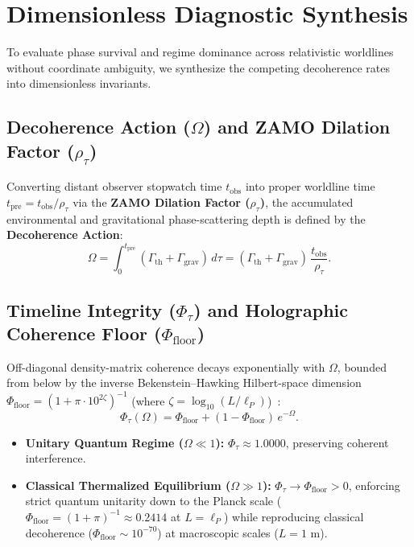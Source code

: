 \documentclass[11pt,a4paper]{article}
\begin{document}
\section{Dimensionless Diagnostic Synthesis}

To evaluate phase survival and regime dominance across relativistic worldlines without coordinate ambiguity, we synthesize the competing decoherence rates into dimensionless invariants.

\subsection{Decoherence Action (\texorpdfstring{$\Omega$}{Omega}) and ZAMO Dilation Factor (\texorpdfstring{$\rho_\tau$}{rho\_tau})}
Converting distant observer stopwatch time $t_{\mathrm{obs}}$ into proper worldline time $t_{\mathrm{pre}} = t_{\mathrm{obs}} / \rho_\tau$ via the \textbf{ZAMO Dilation Factor ($\rho_\tau$)}, the accumulated environmental and gravitational phase-scattering depth is defined by the \textbf{Decoherence Action}:
\begin{equation}
\Omega = \int_0^{t_{\mathrm{pre}}} (\Gamma_{\mathrm{th}} + \Gamma_{\mathrm{grav}})\,d\tau = (\Gamma_{\mathrm{th}} + \Gamma_{\mathrm{grav}})\,\frac{t_{\mathrm{obs}}}{\rho_\tau}.
\end{equation}

\subsection{Timeline Integrity (\texorpdfstring{$\Phi_\tau$}{Phi\_tau}) and Holographic Coherence Floor (\texorpdfstring{$\Phi_{\mathrm{floor}}$}{Phi\_floor})}
Off-diagonal density-matrix coherence decays exponentially with $\Omega$, bounded from below by the inverse Bekenstein--Hawking Hilbert-space dimension $\Phi_{\mathrm{floor}} = (1 + \pi \cdot 10^{2\zeta})^{-1}$ (where $\zeta = \log_{10}(L / \ell_P)$)~\cite{Lloyd2000}:
\begin{equation}
\Phi_\tau(\Omega) = \Phi_{\mathrm{floor}} + (1 - \Phi_{\mathrm{floor}})\,e^{-\Omega}.
\end{equation}
\begin{itemize}
\item \textbf{Unitary Quantum Regime ($\Omega \ll 1$):} $\Phi_\tau \approx 1.0000$, preserving coherent interference.
\item \textbf{Classical Thermalized Equilibrium ($\Omega \gg 1$):} $\Phi_\tau \to \Phi_{\mathrm{floor}} > 0$, enforcing strict quantum unitarity down to the Planck scale ($\Phi_{\mathrm{floor}} = (1 + \pi)^{-1} \approx 0.2414$ at $L = \ell_P$) while reproducing classical decoherence ($\Phi_{\mathrm{floor}} \sim 10^{-70}$) at macroscopic scales ($L = 1\text{ m}$).
\end{itemize}
\end{document}
